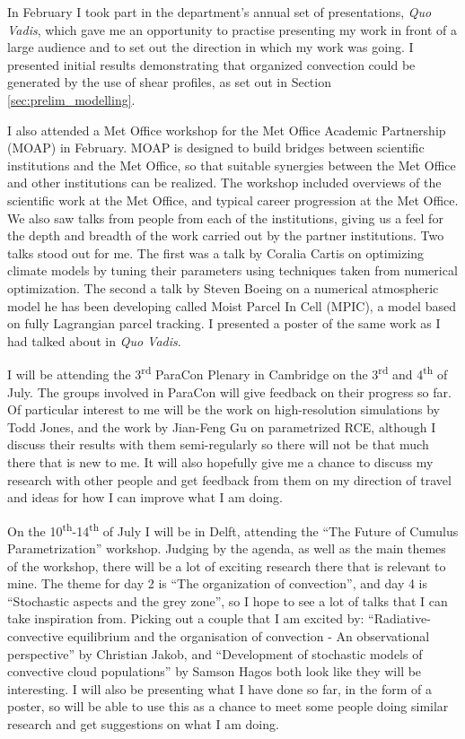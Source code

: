 \documentclass[11pt,a4paper]{article}
\newcommand{\ts}{\textsuperscript}
\begin{document}
In February I took part in the department's annual set of presentations, \textit{Quo Vadis}, which gave me an opportunity to practise presenting my work in front of a large audience and to set out the direction in which my work was going. I presented initial results demonstrating that organized convection could be generated by the use of shear profiles, as set out in Section \ref{sec:prelim_modelling}.

I also attended a Met Office workshop for the Met Office Academic Partnership (MOAP) in February. MOAP is designed to build bridges between scientific institutions and the Met Office, so that suitable synergies between the Met Office and other institutions can be realized. The workshop included overviews of the scientific work at the Met Office, and typical career progression at the Met Office. We also saw talks from people from each of the institutions, giving us a feel for the depth and breadth of the work carried out by the partner institutions. Two talks stood out for me. The first was a talk by Coralia Cartis on optimizing climate models by tuning their parameters using techniques taken from numerical optimization. The second a talk by Steven Boeing on a numerical atmospheric model he has been developing called Moist Parcel In Cell (MPIC), a model based on fully Lagrangian parcel tracking. I presented a poster of the same work as I had talked about in \textit{Quo Vadis}.

I will be attending the 3\ts{rd} ParaCon Plenary in Cambridge on the 3\ts{rd} and 4\ts{th} of July. The groups involved in ParaCon will give feedback on their progress so far. Of particular interest to me will be the work on high-resolution simulations by Todd Jones, and the work by Jian-Feng Gu on parametrized RCE, although I discuss their results with them semi-regularly so there will not be that much there that is new to me. It will also hopefully give me a chance to discuss my research with other people and get feedback from them on my direction of travel and ideas for how I can improve what I am doing.

On the 10\ts{th}-14\ts{th} of July I will be in Delft, attending the ``The Future of Cumulus Parametrization'' workshop. Judging by the agenda, as well as the main themes of the workshop, there will be a lot of exciting research there that is relevant to mine. The theme for day 2 is ``The organization of convection'', and day 4 is ``Stochastic aspects and the grey zone'', so I hope to see a lot of talks that I can take inspiration from. Picking out a couple that I am excited by: ``Radiative-convective equilibrium and the organisation of convection - An observational perspective'' by Christian Jakob, and ``Development of stochastic models of convective cloud populations'' by Samson Hagos both look like they will be interesting. I will also be presenting what I have done so far, in the form of a poster, so will be able to use this as a chance to meet some people doing similar research and get suggestions on what I am doing.
\end{document}
